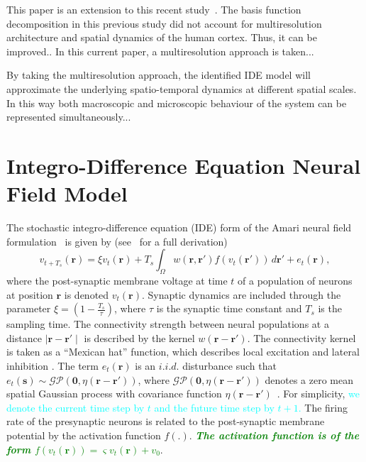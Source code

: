 \documentclass[journal,a4paper]{IEEEtran}
\newcommand{\dean}[1]{\textsf{\emph{\textbf{\textcolor{green}{#1}}}}}
\newcommand{\cut}[1]{\textcolor{cyan}{#1}}
\begin{document}
This paper is an extension to this recent study~\cite{Freestone2011}. The basis function decomposition in this previous study did not account for multiresolution architecture and spatial dynamics of the human cortex. Thus, it can be improved.. In this current paper, a multiresolution approach is taken...

By taking the multiresolution approach, the identified IDE model will approximate the underlying spatio-temporal dynamics at different spatial scales. In this way both macroscopic and microscopic behaviour of the system can be represented simultaneously...

\section{Integro-Difference Equation Neural Field Model}
The stochastic integro-difference equation (IDE) form of the Amari neural field  formulation~\cite{Amari1977} is given by (see~\cite{Freestone2011} for a full derivation)
\begin{equation}\label{eq:DiscreteTimeModel}
	v_{t+T_s}\left(\mathbf{r}\right) = 
	\xi v_t\left(\mathbf{r}\right) + 
	T_s \int_\Omega { 
	    w\left(\mathbf{r},\mathbf{r'}\right)
	    f\left(v_t\left(\mathbf{r}'\right)\right) 
	\, d\mathbf{r}'} 
	+ e_t\left(\mathbf{r}\right), 
\end{equation}
where the post-synaptic membrane voltage at time $t$ of a population of neurons at position $\mathbf r$ is denoted $v_t\left(\mathbf r\right)$. Synaptic dynamics are included through the parameter $\xi=\left(1-\frac{ T_s}{\tau}\right)$, where $\tau$ is the synaptic time constant and $T_s$ is the sampling time. The connectivity strength between neural populations at a distance $\mid\mathbf{r}-\mathbf{r'}\mid$ is described by the kernel $w\left(\mathbf{r}-\mathbf{r}'\right)$. The connectivity kernel is taken as a ``Mexican hat'' function, which describes local excitation and lateral inhibition \cite{Amari1977}. The term $e_t(\mathbf r)$ is an $i.i.d.$ disturbance such that $e_t(\mathbf{s})\sim\mathcal{GP}(\mathbf 0,\eta(\mathbf{r}-\mathbf{r'}))$, where $\mathcal{GP}(\mathbf 0,\eta(\mathbf{r}-\mathbf{r'}))$  denotes a zero mean spatial Gaussian process with covariance function $\eta(\mathbf{r}-\mathbf{r'})$~\cite{Rasmussen2005}. For simplicity, \cut{we denote the current time step by $t$ and the future time step by $t+1$.} The firing rate of the presynaptic neurons is related to the post-synaptic membrane potential by the activation function $f\left(.\right)$. \dean{The activation function is of the form $f(v_t(\mathbf{r})) = \varsigma v_t(\mathbf{r}) + v_0$}. 
\end{document}

